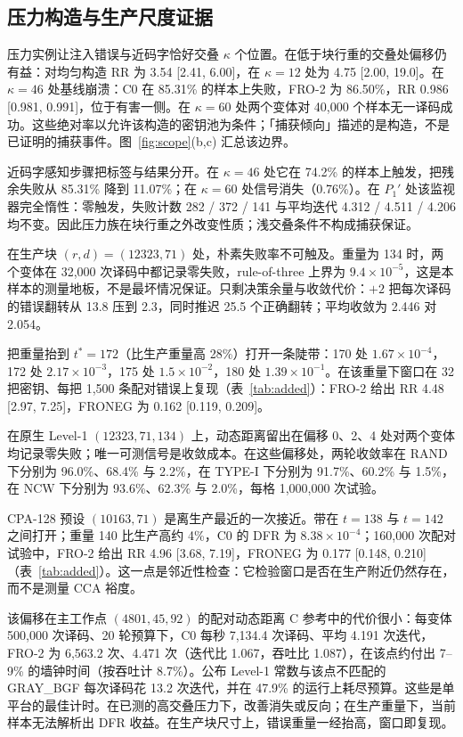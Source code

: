 \subsection{压力构造与生产尺度证据}\label{sec:boundary}

压力实例让注入错误与近码字恰好交叠 $\kappa$ 个位置。在低于块行重的交叠处偏移仍有益：对均匀构造 RR 为 3.54 [2.41, 6.00]，在 $\kappa=12$ 处为 4.75 [2.00, 19.0]。在 $\kappa=46$ 处基线崩溃：C0 在 85.31\% 的样本上失败，FRO-2 为 86.50\%，RR 0.986 [0.981, 0.991]，位于有害一侧。在 $\kappa=60$ 处两个变体对 40{,}000 个样本无一译码成功。这些绝对率以允许该构造的密钥池为条件；「捕获倾向」描述的是构造，不是已证明的捕获事件。图~\ref{fig:scope}(b,c) 汇总该边界。

近码字感知步骤把标签与结果分开。在 $\kappa=46$ 处它在 74.2\% 的样本上触发，把残余失败从 85.31\% 降到 11.07\%；在 $\kappa=60$ 处信号消失（0.76\%）。在 $P_1'$ 处该监视器完全惰性：零触发，失败计数 282 / 372 / 141 与平均迭代 4.312 / 4.511 / 4.206 均不变。因此压力族在块行重之外改变性质；浅交叠条件不构成捕获保证。

在生产块 $(r,d)=(12323,71)$ 处，朴素失败率不可触及。重量为 134 时，两个变体在 32{,}000 次译码中都记录零失败，rule-of-three 上界为 $9.4\times10^{-5}$，这是本样本的测量地板，不是最坏情况保证。只剩决策余量与收敛代价：$+2$ 把每次译码的错误翻转从 13.8 压到 2.3，同时推迟 25.5 个正确翻转；平均收敛为 2.446 对 2.054。\label{sec:production}

把重量抬到 $t^\ast=172$（比生产重量高 28\%）打开一条陡带：170 处 $1.67\times10^{-4}$，172 处 $2.17\times10^{-3}$，175 处 $1.5\times10^{-2}$，180 处 $1.39\times10^{-1}$。在该重量下窗口在 32 把密钥、每把 1{,}500 条配对错误上复现（表~\ref{tab:added}）：FRO-2 给出 RR 4.48 [2.97, 7.25]，FRONEG 为 0.162 [0.119, 0.209]。

在原生 Level-1 $(12323,71,134)$ 上，动态距离留出在偏移 0、2、4 处对两个变体均记录零失败；唯一可测信号是收敛成本。在这些偏移处，两轮收敛率在 RAND 下分别为 96.0\%、68.4\% 与 2.2\%，在 TYPE-I 下分别为 91.7\%、60.2\% 与 1.5\%，在 NCW 下分别为 93.6\%、62.3\% 与 2.0\%，每格 1{,}000{,}000 次试验。

CPA-128 预设 $(10163,71)$ 是离生产最近的一次接近。带在 $t=138$ 与 $t=142$ 之间打开；重量 140 比生产高约 4\%，C0 的 DFR 为 $8.38\times10^{-4}$；160{,}000 次配对试验中，FRO-2 给出 RR 4.96 [3.68, 7.19]，FRONEG 为 0.177 [0.148, 0.210]（表~\ref{tab:added}）。这一点是邻近性检查：它检验窗口是否在生产附近仍然存在，而不是测量 CCA 裕度。

该偏移在主工作点 $(4801,45,92)$ 的配对动态距离 C 参考中的代价很小：每变体 500{,}000 次译码、20 轮预算下，C0 每秒 7{,}134.4 次译码、平均 4.191 次迭代，FRO-2 为 6{,}563.2 次、4.471 次（迭代比 1.067，吞吐比 1.087），在该点约付出 7--9\% 的墙钟时间（按吞吐计 8.7\%）。公布 Level-1 常数与该点不匹配的 GRAY\_BGF 每次译码花 13.2 次迭代，并在 47.9\% 的运行上耗尽预算。这些是单平台的最佳计时。在已测的高交叠压力下，改善消失或反向；在生产重量下，当前样本无法解析出 DFR 收益。在生产块尺寸上，错误重量一经抬高，窗口即复现。

